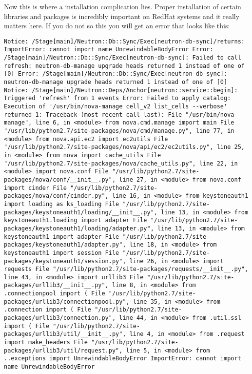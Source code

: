 \documentclass[
  letterpaper,
  DIV=11,
  numbers=noendperiod]{scrreprt}
\begin{document}

Now this is where a installation complication lies. Proper installation
of certain libraries and packages is incredibly important on RedHat
systems and it really matters here. If you do not so this you will get
an error that looks like this:

\begin{verbatim}
Notice: /Stage[main]/Neutron::Db::Sync/Exec[neutron-db-sync]/returns: ImportError: cannot import name UnrewindableBodyError Error: /Stage[main]/Neutron::Db::Sync/Exec[neutron-db-sync]: Failed to call refresh: neutron-db-manage upgrade heads returned 1 instead of one of [0] Error: /Stage[main]/Neutron::Db::Sync/Exec[neutron-db-sync]: neutron-db-manage upgrade heads returned 1 instead of one of [0] Notice: /Stage[main]/Neutron::Deps/Anchor[neutron::service::begin]: Triggered 'refresh' from 1 events Error: Failed to apply catalog: Execution of '/usr/bin/nova-manage cell_v2 list_cells --verbose' returned 1: Traceback (most recent call last): File "/usr/bin/nova-manage", line 6, in <module> from nova.cmd.manage import main File "/usr/lib/python2.7/site-packages/nova/cmd/manage.py", line 77, in <module> from nova.api.ec2 import ec2utils File "/usr/lib/python2.7/site-packages/nova/api/ec2/ec2utils.py", line 25, in <module> from nova import cache_utils File "/usr/lib/python2.7/site-packages/nova/cache_utils.py", line 22, in <module> import nova.conf File "/usr/lib/python2.7/site-packages/nova/conf/__init__.py", line 27, in <module> from nova.conf import cinder File "/usr/lib/python2.7/site-packages/nova/conf/cinder.py", line 16, in <module> from keystoneauth1 import loading as ks_loading File "/usr/lib/python2.7/site-packages/keystoneauth1/loading/__init__.py", line 13, in <module> from keystoneauth1.loading import adapter File "/usr/lib/python2.7/site-packages/keystoneauth1/loading/adapter.py", line 13, in <module> from keystoneauth1 import adapter File "/usr/lib/python2.7/site-packages/keystoneauth1/adapter.py", line 18, in <module> from keystoneauth1 import session File "/usr/lib/python2.7/site-packages/keystoneauth1/session.py", line 26, in <module> import requests File "/usr/lib/python2.7/site-packages/requests/__init__.py", line 43, in <module> import urllib3 File "/usr/lib/python2.7/site-packages/urllib3/__init__.py", line 8, in <module> from .connectionpool import ( File "/usr/lib/python2.7/site-packages/urllib3/connectionpool.py", line 35, in <module> from .connection import ( File "/usr/lib/python2.7/site-packages/urllib3/connection.py", line 44, in <module> from .util.ssl_ import ( File "/usr/lib/python2.7/site-packages/urllib3/util/__init__.py", line 4, in <module> from .request import make_headers File "/usr/lib/python2.7/site-packages/urllib3/util/request.py", line 5, in <module> from ..exceptions import UnrewindableBodyError ImportError: cannot import name UnrewindableBodyError
\end{verbatim}
\end{document}
